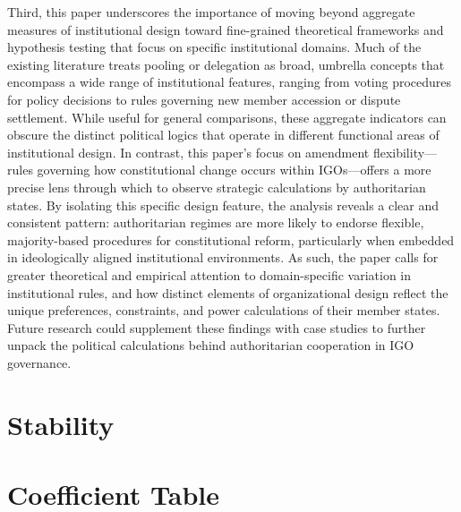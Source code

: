 \documentclass[12pt]{article}
\begin{document}
Third, this paper underscores the importance of moving beyond aggregate measures of institutional design toward fine-grained theoretical frameworks and hypothesis testing that focus on specific institutional domains. Much of the existing literature treats pooling or delegation as broad, umbrella concepts that encompass a wide range of institutional features, ranging from voting procedures for policy decisions to rules governing new member accession or dispute settlement. While useful for general comparisons, these aggregate indicators can obscure the distinct political logics that operate in different functional areas of institutional design. In contrast, this paper's focus on amendment flexibility---rules governing how constitutional change occurs within IGOs---offers a more precise lens through which to observe strategic calculations by authoritarian states. By isolating this specific design feature, the analysis reveals a clear and consistent pattern: authoritarian regimes are more likely to endorse flexible, majority-based procedures for constitutional reform, particularly when embedded in ideologically aligned institutional environments. As such, the paper calls for greater theoretical and empirical attention to domain-specific variation in institutional rules, and how distinct elements of organizational design reflect the unique preferences, constraints, and power calculations of their member states. Future research could supplement these findings with case studies to further unpack the political calculations behind authoritarian cooperation in IGO governance.

\printbibliography

\appendix


\section{Stability}
\begin{table}[H]
\centering
\label{app:stability}

\end{table}


\section{Coefficient Table}
\begin{table}[H]
\centering
\label{app:coef_table}

\end{table}
\end{document}
